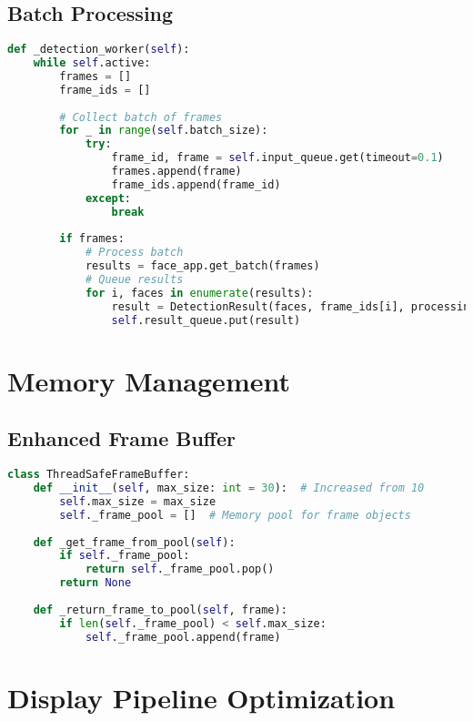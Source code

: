 \subsection{Batch Processing}
\begin{lstlisting}[language=Python]
def _detection_worker(self):
    while self.active:
        frames = []
        frame_ids = []
        
        # Collect batch of frames
        for _ in range(self.batch_size):
            try:
                frame_id, frame = self.input_queue.get(timeout=0.1)
                frames.append(frame)
                frame_ids.append(frame_id)
            except:
                break
                
        if frames:
            # Process batch
            results = face_app.get_batch(frames)
            # Queue results
            for i, faces in enumerate(results):
                result = DetectionResult(faces, frame_ids[i], processing_time)
                self.result_queue.put(result)
\end{lstlisting}

\section{Memory Management}

\subsection{Enhanced Frame Buffer}
\begin{lstlisting}[language=Python]
class ThreadSafeFrameBuffer:
    def __init__(self, max_size: int = 30):  # Increased from 10
        self.max_size = max_size
        self._frame_pool = []  # Memory pool for frame objects
        
    def _get_frame_from_pool(self):
        if self._frame_pool:
            return self._frame_pool.pop()
        return None
        
    def _return_frame_to_pool(self, frame):
        if len(self._frame_pool) < self.max_size:
            self._frame_pool.append(frame)
\end{lstlisting}

\section{Display Pipeline Optimization}

